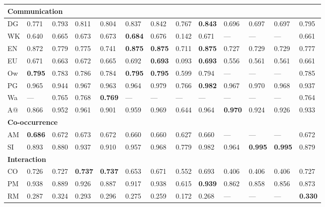 \begin{longtable}{ lllllllllllll }
\hline
\multicolumn{13}{|l|}{\textbf{Communication}} \\
\hline
\textsf{DG}                   & 0.771 & 0.793 & 0.811 & 0.804 & 0.837 & 0.842 & 0.767 & \bf{0.843} & 0.696 & 0.697 & 0.697 & 0.795 \\
\textsf{WK}                   & 0.640 & 0.665 & 0.673 & 0.673 & \bf{0.684} & 0.676 & 0.142 & 0.671 & --- & --- & --- & 0.661 \\
\textsf{EN}                   & 0.872 & 0.779 & 0.775 & 0.741 & \bf{0.875} & \bf{0.875} & 0.711 & \bf{0.875} & 0.727 & 0.729 & 0.729 & 0.777 \\
\textsf{EU}                   & 0.671 & 0.663 & 0.672 & 0.665 & 0.692 & \bf{0.693} & 0.093 & \bf{0.693} & 0.556 & 0.561 & 0.561 & 0.661 \\
\textsf{Ow}                   & \bf{0.795} & 0.783 & 0.786 & 0.784 & \bf{0.795} & \bf{0.795} & 0.599 & 0.794 & --- & --- & --- & 0.785 \\
\textsf{PG}                   & 0.965 & 0.944 & 0.967 & 0.963 & 0.964 & 0.979 & 0.766 & \bf{0.982} & 0.967 & 0.970 & 0.968 & 0.937 \\
\textsf{Wa}                   & --- & 0.765 & 0.768 & \bf{0.769} & --- & --- & --- & --- & --- & --- & --- & 0.764 \\
\textsf{A@}                   & 0.866 & 0.952 & 0.961 & 0.901 & 0.959 & 0.969 & 0.644 & 0.964 & \bf{0.970} & 0.924 & 0.926 & 0.933 \\

\hline
\multicolumn{13}{|l|}{\textbf{Co-occurrence}} \\
\hline
\textsf{AM}                   & \bf{0.686} & 0.672 & 0.673 & 0.672 & 0.660 & 0.660 & 0.627 & 0.660 & --- & --- & --- & 0.672 \\
\textsf{SI}                   & 0.893 & 0.880 & 0.937 & 0.910 & 0.957 & 0.968 & 0.779 & 0.982 & 0.964 & \bf{0.995} & \bf{0.995} & 0.879 \\

\hline
\multicolumn{13}{|l|}{\textbf{Interaction}} \\
\hline
\textsf{CO}                   & 0.726 & 0.727 & \bf{0.737} & \bf{0.737} & 0.653 & 0.671 & 0.552 & 0.693 & 0.406 & 0.406 & 0.406 & 0.727 \\
\textsf{PM}                   & 0.938 & 0.889 & 0.926 & 0.887 & 0.917 & 0.938 & 0.615 & \bf{0.939} & 0.862 & 0.858 & 0.856 & 0.873 \\
\textsf{RM}                   & 0.287 & 0.324 & 0.293 & 0.296 & 0.275 & 0.259 & 0.172 & 0.268 & --- & --- & --- & \bf{0.330} \\


\end{longtable}
